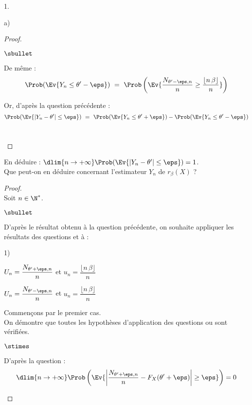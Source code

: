 \documentclass[11pt]{article}%
\begin{document}
\begin{noliste}{1.}
\begin{noliste}{a)}
\begin{proof}
\begin{noliste}{$\sbullet$}
	\item De même :
	\[
	  \Prob(\Ev{Y_n \leq \theta' -\eps}) \ = \
	  \Prob\left( \Ev{ \dfrac{N_{\theta' -\eps,n}}{n} \geq 
	  \dfrac{\lfloor n\, \beta \rfloor}{n}}\right)
	\]
	
	\item Or, d'après la question précédente :
	\[
	  \Prob(\Ev{ \vert Y_n - \theta' \vert \leq \eps})
	  \ = \ \Prob(\Ev{Y_n \leq \theta' +\eps}) -
	  \Prob(\Ev{Y_n \leq \theta' - \eps})
	\]
	~\\[-1.2cm]
      \end{noliste}
    \end{proof}
    
    \item En déduire : $\dlim{n \to +\infty} 
    \Prob(\Ev{|Y_n - \theta'| \leq \eps})=1$.\\
    Que peut-on en déduire concernant l'estimateur $Y_n$ de 
    $r_\beta(X)$ ?
    
    \begin{proof}~\\
    Soit $n\in \N^*$.
      \begin{noliste}{$\sbullet$}
	\item D'après le résultat obtenu à la question 
	précédente, on souhaite appliquer les résultats des questions 
	 et  à :
	\begin{noliste}{\scriptsize 1)}
	  \item $U_n = \dfrac{N_{\theta'+\eps,n}}{n}$ et $u_n = 
	  \dfrac{\lfloor n \, \beta \rfloor}{n}$
	  \item $U_n = \dfrac{N_{\theta'-\eps,n}}{n}$ et $u_n = 
	  \dfrac{\lfloor n \, \beta \rfloor}{n}$
	\end{noliste}
	Commençons par le premier cas.\\
	On démontre que toutes les hypothèses 
	d'application des questions  ou  sont 
	vérifiées.
	\begin{noliste}{$\stimes$}
	  \item D'après la question  :
	  \[
	    \dlim{n\to +\infty} \Prob\left( \Ev{ \left\vert
	    \dfrac{N_{\theta' + \eps,n}}{n} - F_X(\theta' +\eps) 
	    \right\vert \geq \eps}\right) = 0
	  \]
	  

\end{noliste}
\end{noliste}
\end{proof}
\end{noliste}
\end{noliste}
\end{document}
